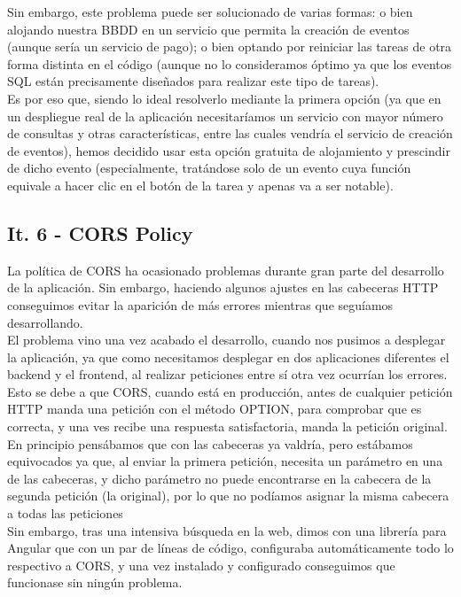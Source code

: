Sin embargo, este problema puede ser solucionado de varias formas: o bien alojando nuestra BBDD en un servicio que permita la creación de eventos (aunque sería un servicio de pago); o bien optando por reiniciar las tareas de otra forma distinta en el código (aunque no lo consideramos óptimo ya que los eventos SQL están precisamente diseñados para realizar este tipo de tareas).\\

Es por eso que, siendo lo ideal resolverlo mediante la primera opción (ya que en un despliegue real de la aplicación necesitaríamos un servicio con mayor número de consultas y otras características, entre las cuales vendría el servicio de creación de eventos), hemos decidido usar esta opción gratuita de alojamiento y prescindir de dicho evento (especialmente, tratándose solo de un evento cuya función equivale a hacer clic en el botón de la tarea y apenas va a ser notable).\\

\subsection{It. 6 - CORS Policy}

La política de CORS ha ocasionado problemas durante gran parte del desarrollo de la aplicación. Sin embargo, haciendo algunos ajustes en las cabeceras HTTP conseguimos evitar la aparición de más errores mientras que seguíamos desarrollando.\\

El problema vino una vez acabado el desarrollo, cuando nos pusimos a desplegar la aplicación, ya que como necesitamos desplegar en dos aplicaciones diferentes el backend y el frontend, al realizar peticiones entre sí otra vez ocurrían los errores. Esto se debe a que CORS, cuando está en producción, antes de cualquier petición HTTP manda una petición con el método OPTION, para comprobar que es correcta, y una ves recibe una respuesta satisfactoria, manda la petición original.\\

En principio pensábamos que con las cabeceras ya valdría, pero estábamos equivocados ya que, al enviar la primera petición, necesita un parámetro en una de las cabeceras, y dicho parámetro no puede encontrarse en la cabecera de la segunda petición (la original), por lo que no podíamos asignar la misma cabecera a todas las peticiones\\

Sin embargo, tras una intensiva búsqueda en la web, dimos con una librería para Angular que con un par de líneas de código, configuraba automáticamente todo lo respectivo a CORS, y una vez instalado y configurado conseguimos que funcionase sin ningún problema.\\

